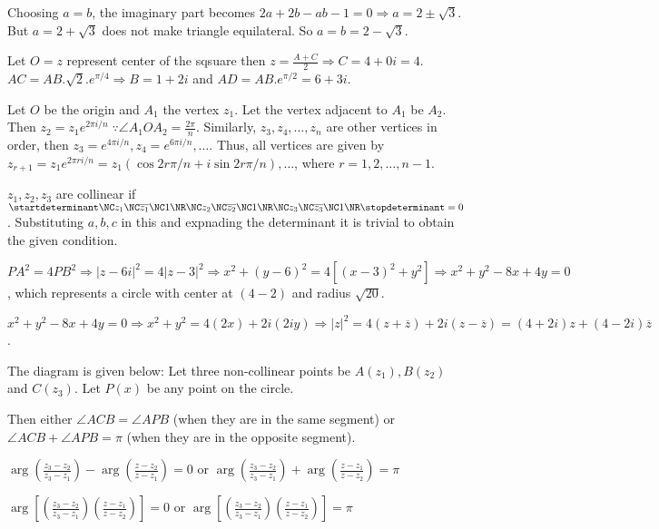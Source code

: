   Choosing $a = b$, the imaginary part becomes $2a + 2b - ab - 1 = 0 \Rightarrow a = 2 \pm \sqrt{3}$. But $a
  = 2 + \sqrt{3}$ does not make triangle equilateral. So $a = b = 2 - \sqrt{3}$.
\item Let $O = z$ represent center of the sqsuare then $z = \frac{A + C}{2} \Rightarrow C = 4 + 0i = 4$.
  $AC = AB.\sqrt{2}.e^{\pi/4} \Rightarrow B = 1 + 2i$ and $AD = AB.e^{\pi/2} = 6 + 3i$.
\item Let $O$ be the origin and $A_1$ the vertex $z_1$. Let the vertex adjacent to $A_1$ be $A_2$. Then $z_2
  = z_1e^{2\pi i/n}\;\because \angle A_1OA_2 = \frac{2\pi}{n}$. Similarly, $z_3, z_4, \ldots, z_n$ are other
  vertices in order, then $z_3 = e^{4\pi i/n}, z_4 = e^{6\pi i/n}, \ldots$. Thus, all vertices are given by
  $z_{r + 1} = z_1e^{2\pi ri/n} = z_1(\cos2r\pi/n + i\sin2r\pi/n), \ldots$, where $r = 1, 2, \ldots, n - 1$.
\item $z_1, z_2, z_3$ are collinear if $\startdeterminant\NC z_1 \NC \overline{z_1}\NC1\NR\NC z_2 \NC
  \overline{z_2}\NC1\NR\NC z_3 \NC \overline{z_3}\NC1 \NR\stopdeterminant=0$. Substituting $a, b, c$ in this
  and expnading the determinant it is trivial to obtain the given condition.
\item $PA^2 = 4PB^2 \Rightarrow |z - 6i|^2 = 4|z - 3|^2 \Rightarrow x^2 + (y - 6)^2 = 4[(x - 3)^2 + y^2]
  \Rightarrow x^2 + y^2 - 8x + 4y = 0$, which represents a circle with center at $(4 -2)$ and radius
  $\sqrt{20}$.

  $x^2 + y^2 - 8x + 4y = 0 \Rightarrow x^2 + y^2 = 4(2x) + 2i(2iy) \Rightarrow |z|^2 = 4(z +
  \overline{z}) + 2i(z - \overline{z}) = (4 + 2i)z + (4 - 2i)\overline{z}$.
\item The diagram is given below:
  \startplacefigure[location={left, none}]
  \stopplacefigure
  Let three non-collinear points be $A(z_1), B(z_2)$ and $C(z_3)$. Let $P(x)$ be any point on the circle.

  Then either $\angle ACB = \angle APB$ (when they are in the same segment) or $\angle ACB + \angle APB =
  \pi$ (when they are in the opposite segment).

  $\arg\left(\frac{z_3 - z_2}{z_3 - z_1}\right) - \arg\left(\frac{z - z_2}{z - z_1}\right) = 0$ or
  $\arg\left(\frac{z_3 - z_2}{z_3 - z_1}\right) + \arg\left(\frac{z - z_1}{z - z_2}\right) = \pi$

  $\arg\left[\left(\frac{z_3 - z_2}{z_3 - z_1}\right)\left(\frac{z - z_1}{z - z_2}\right)\right] = 0$ or
  $\arg\left[\left(\frac{z_3 - z_2}{z_3 - z_1}\right)\left(\frac{z - z_1}{z - z_2}\right)\right] = \pi$

